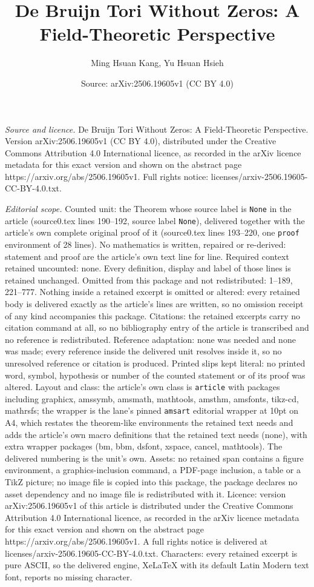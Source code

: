 \documentclass[10pt,a4paper]{amsart}
\title[De Bruijn Tori Without Zeros: A Field-Theoretic Perspective]{De Bruijn Tori Without Zeros: A Field-Theoretic Perspective}
\author{Ming Hsuan Kang, Yu Hsuan Hsieh}
\date{Source: arXiv:2506.19605v1 (CC BY 4.0)}
\begin{document}
\maketitle

\noindent\emph{Source and licence.} De Bruijn Tori Without Zeros: A Field-Theoretic Perspective. Version arXiv:2506.19605v1 (CC BY 4.0), distributed under the Creative Commons Attribution 4.0 International licence, as recorded in the arXiv licence metadata for this exact version and shown on the abstract page https://arxiv.org/abs/2506.19605v1. Full rights notice: licenses/arxiv-2506.19605-CC-BY-4.0.txt.\par\smallskip

\noindent\textit{Editorial scope.} Counted unit: the Theorem whose source label is \texttt{None} in the article (source0.tex lines 190--192, source label \texttt{None}), delivered together with the article's own complete original proof of it (source0.tex lines 193--220, one \texttt{proof} environment of 28 lines). No mathematics is written, repaired or re-derived: statement and proof are the article's own text line for line. Required context retained uncounted: none. Every definition, display and label of those lines is retained unchanged. Omitted from this package and not redistributed: 1--189, 221--777. Nothing inside a retained excerpt is omitted or altered: every retained body is delivered exactly as the article's lines are written, so no omission receipt of any kind accompanies this package. Citations: the retained excerpts carry no citation command at all, so no bibliography entry of the article is transcribed and no reference is redistributed. Reference adaptation: none was needed and none was made; every reference inside the delivered unit resolves inside it, so no unresolved reference or citation is produced. Printed slips kept literal: no printed word, symbol, hypothesis or number of the counted statement or of its proof was altered. Layout and class: the article's own class is \texttt{article} with packages including graphicx, amssymb, amsmath, mathtools, amsthm, amsfonts, tikz-cd, mathrsfs; the wrapper is the lane's pinned \texttt{amsart} editorial wrapper at 10pt on A4, which restates the theorem-like environments the retained text needs and adds the article's own macro definitions that the retained text needs (none), with extra wrapper packages (bm, bbm, dsfont, xspace, cancel, mathtools). The delivered numbering is the unit's own. Assets: no retained span contains a figure environment, a graphics-inclusion command, a PDF-page inclusion, a table or a TikZ picture; no image file is copied into this package, the package declares no asset dependency and no image file is redistributed with it. Licence: version arXiv:2506.19605v1 of this article is distributed under the Creative Commons Attribution 4.0 International licence, as recorded in the arXiv licence metadata for this exact version and shown on the abstract page https://arxiv.org/abs/2506.19605v1. A full rights notice is delivered at licenses/arxiv-2506.19605-CC-BY-4.0.txt. Characters: every retained excerpt is pure ASCII, so the delivered engine, XeLaTeX with its default Latin Modern text font, reports no missing character.
\end{document}
